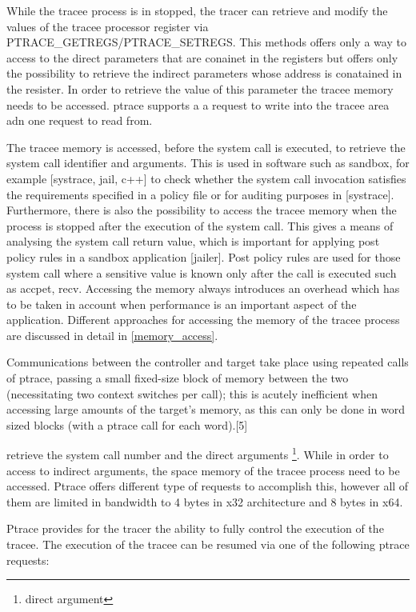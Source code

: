  
While the tracee process is in stopped, the tracer can retrieve and modify the values of the tracee processor register via PTRACE\_GETREGS/PTRACE\_SETREGS. This methods offers only a way to access to the direct parameters that are conainet in the registers but offers only the possibility to retrieve the indirect parameters whose address is conatained in the resister. In order to retrieve the value of this parameter the tracee memory needs to be accessed. ptrace supports a a request to write into the tracee area adn one request to read from.   

The tracee memory is accessed, before the system call is executed, to retrieve the system call identifier and arguments. This is used in software such as sandbox, for example [systrace, jail, c++] to check whether the system call invocation satisfies the requirements specified in a policy file or for auditing purposes in [systrace]. Furthermore, there is also the possibility to access the tracee memory when the process is stopped after the execution of the system call. This gives a means of analysing the system call return value, which is important for applying post policy rules in a sandbox application [jailer]. Post policy rules are used for those system call where a sensitive value is known only after the call is executed such as accpet, recv. Accessing the memory always introduces an overhead which has to be taken in account when performance is an important aspect of the application. Different approaches for accessing the memory of the tracee process are discussed in detail in \ref{memory_access}. 

Communications between the controller and target take place using repeated calls of ptrace, passing a small fixed-size block of memory between the two (necessitating two context switches per call); this is acutely inefficient when accessing large amounts of the target's memory, as this can only be done in word sized blocks (with a ptrace call for each word).[5] 

retrieve the system call number and the direct arguments  \footnote{ direct argument}. While in order to access to indirect arguments, the space memory of the tracee process need to be accessed. Ptrace offers different type of requests \cite{ptrace} to accomplish this, however all of them are limited in bandwidth to 4 bytes in x32 architecture and 8 bytes in x64.

Ptrace provides for the tracer the ability to fully control the execution of the tracee. The execution of the tracee can be resumed via one of the following ptrace requests:

